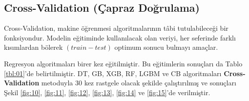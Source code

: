 \documentclass[conference]{IEEEtran}
\begin{document}
\subsection{\textbf{Cross-Validation (Çapraz Doğrulama)}}
\quad Cross-Validation, makine öğrenmesi algoritmalarının tâbi tutulabileceği bir fonksiyondur. Modelin eğitiminde kullanılacak olan veriyi, her seferinde farklı kısımlardan bölerek $(train-test)$ optimum sonucu bulmayı amaçlar.

\quad Regresyon algoritmaları birer kez eğitilmiştir. Bu eğitimlerin sonuçları da Tablo \ref{tbl:01}'de belirtilmiştir. DT, GB, XGB, RF, LGBM ve CB algoritmaları \textbf{Cross-Validation} metoduyla 30 kez rastgele olacak şekilde çalıştırılmış ve sonuçları Şekil \ref{fig:10}, \ref{fig:11}, \ref{fig:12}, \ref{fig:13}, \ref{fig:14} ve \ref{fig:15}'de verilmiştir.
\end{document}
